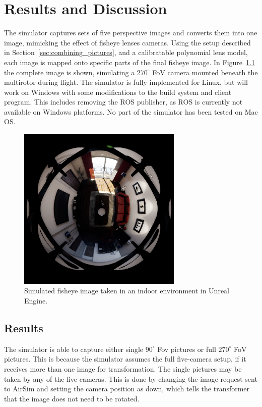 
\chapter{Results and Discussion}

The simulator captures sets of five perspective images and converts them into one image, mimicking the effect of fisheye lenses cameras. Using the setup described in Section~\ref{sec:combining_pictures}, and a calibratable polynomial lens model, each image is mapped onto specific parts of the final fisheye image. In Figure~\ref{fig:res_show_fisheye} the complete image is shown, simulating a $270^\circ$ FoV camera mounted beneath the multirotor during flight. The simulator is fully implemented for Linux, but will work on Windows with some modifications to the build system and client program. This includes removing the ROS publisher, as ROS is currently not available on Windows platforms. No part of the simulator has been tested on Mac OS. 

\begin{figure}[!htb]
    \centering
    \includegraphics[width=0.7\textwidth]{rapport/fig/Results/1024to1024.jpeg}
    \caption{Simulated fisheye image taken in an indoor environment in Unreal Engine.}
    \label{fig:res_show_fisheye}
\end{figure}

\section{Results} \label{sec:Results}

The simulator is able to capture either single $90^\circ$ Fov pictures or full $270^\circ$ FoV pictures. This is because the simulator assumes the full five-camera setup, if it receives more than one image for transformation. The single pictures may be taken by any of the five cameras. This is done by changing the image request sent to AirSim and setting the camera position as down, which tells the transformer that the image does not need to be rotated.


